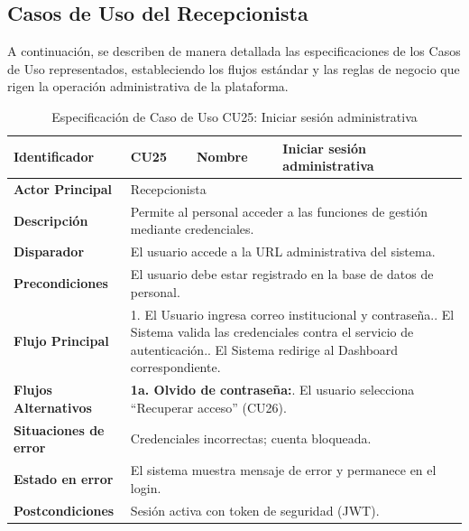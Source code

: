 \subsection{Casos de Uso del Recepcionista}
\label{subsec:casos_uso_recepcionista}

A continuación, se describen de manera detallada las especificaciones de los Casos de Uso representados, estableciendo los flujos estándar y las reglas de negocio que rigen la operación administrativa de la plataforma.

\vspace{0.5cm}
\begingroup
\setlength{\parskip}{0pt}
\begin{longtable}{|p{3.5cm}|p{2cm}|p{2.5cm}|p{7cm}|}
\caption{Especificación de Caso de Uso CU25: Iniciar sesión administrativa}
\label{tab:cu25_login} \\
\hline
\textbf{Identificador} & CU25 & \textbf{Nombre} & Iniciar sesión administrativa \\ \hline
\textbf{Actor Principal} & \multicolumn{3}{p{11.5cm}|}{Recepcionista} \\ \hline
\textbf{Descripción} & \multicolumn{3}{p{11.5cm}|}{Permite al personal acceder a las funciones de gestión mediante credenciales.} \\ \hline
\textbf{Disparador} & \multicolumn{3}{p{11.5cm}|}{El usuario accede a la URL administrativa del sistema.} \\ \hline
\textbf{Precondiciones} & \multicolumn{3}{p{11.5cm}|}{El usuario debe estar registrado en la base de datos de personal.} \\ \hline
\textbf{Flujo Principal} & \multicolumn{3}{p{11.5cm}|}{1. El Usuario ingresa correo institucional y contraseña.\newline 2. El Sistema valida las credenciales contra el servicio de autenticación.\newline 3. El Sistema redirige al Dashboard correspondiente.} \\ \hline
\textbf{Flujos Alternativos} & \multicolumn{3}{p{11.5cm}|}{\textbf{1a. Olvido de contraseña:}\newline 1. El usuario selecciona ``Recuperar acceso'' (CU26).} \\ \hline
\textbf{Situaciones de error} & \multicolumn{3}{p{11.5cm}|}{Credenciales incorrectas; cuenta bloqueada.} \\ \hline
\textbf{Estado en error} & \multicolumn{3}{p{11.5cm}|}{El sistema muestra mensaje de error y permanece en el login.} \\ \hline
\textbf{Postcondiciones} & \multicolumn{3}{p{11.5cm}|}{Sesión activa con token de seguridad (JWT).} \\ \hline
\end{longtable}
\endgroup

